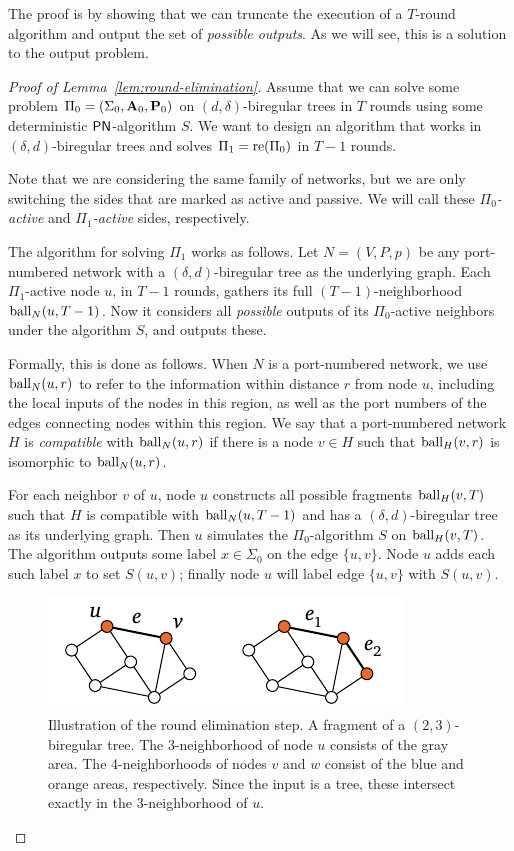 The proof is by showing that we can truncate the execution of a $T$-round algorithm and output the set of \emph{possible outputs}. As we will see, this is a solution to the output problem.

\begin{proof}[Proof of Lemma~\ref{lem:round-elimination}]
	Assume that we can solve some problem $\Pi_0 = (\Sigma_0, \mathbf{A}_0, \mathbf{P}_0)$ on $(d,\delta)$-biregular trees in $T$ rounds using some deterministic $\textup{\sffamily PN}$-algorithm $S$. We want to design an algorithm that works in $(\delta,d)$-biregular trees and solves $\Pi_1 = \operatorname{re}(\Pi_0)$ in $T-1$ rounds.
	
	Note that we are considering the same family of networks, but we are only switching the sides that are marked as active and passive. We will call these \emph{$\Pi_0$-active} and \emph{$\Pi_1$-active} sides, respectively.
	
	The algorithm for solving $\Pi_1$ works as follows. Let $N = (V,P,p)$ be any port-numbered network with a $(\delta,d)$-biregular tree as the underlying graph. Each $\Pi_1$-active node $u$, in $T-1$ rounds, gathers its full $(T-1)$-neighborhood $\operatorname{ball}_N(u, T-1)$. Now it considers all \emph{possible} outputs of its $\Pi_0$-active neighbors under the algorithm $S$, and outputs these.
	
	Formally, this is done as follows. When $N$ is a port-numbered network, we use $\operatorname{ball}_{N}(u,r)$ to refer to the information within distance $r$ from node $u$, including the local inputs of the nodes in this region, as well as the port numbers of the edges connecting nodes within this region. We say that a port-numbered network $H$ is \emph{compatible} with $\operatorname{ball}_{N}(u,r)$ if there is a node $v \in H$ such that $\operatorname{ball}_{H}(v,r)$ is isomorphic to $\operatorname{ball}_{N}(u,r)$.

	For each neighbor $v$ of $u$, node $u$ constructs all possible fragments $\operatorname{ball}_{H}(v, T)$ such that $H$ is compatible with $\operatorname{ball}_N(u,T-1)$ and has a $(\delta,d)$-biregular tree as its underlying graph. Then $u$ simulates the $\Pi_0$-algorithm $S$ on $\operatorname{ball}_{H}(v,T)$. The algorithm outputs some label $x \in \Sigma_0$ on the edge $\{u,v\}$. Node $u$ adds each such label $x$ to set $S(u,v)$; finally node $u$ will label edge $\{u,v\}$ with $S(u,v)$.
	
	\begin{figure}
		\centering
		\includegraphics[page=\PRoundElimination,scale=0.3]{figs.pdf}
		\caption{Illustration of the round elimination step. A fragment of a $(2,3)$-biregular tree. The 3-neighborhood of node $u$ consists of the gray area. The 4-neighborhoods of nodes $v$ and $w$ consist of the blue and orange areas, respectively. Since the input is a tree, these intersect exactly in the 3-neighborhood of $u$.} \label{fig:round-elimination}
	\end{figure}
	

\end{proof}
